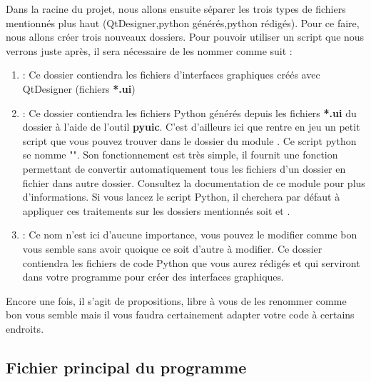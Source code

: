 Dans la racine du projet, nous allons ensuite séparer les trois types de fichiers mentionnés plus haut (QtDesigner,python générés,python rédigés). Pour ce faire, nous allons créer  trois nouveaux dossiers. Pour pouvoir utiliser un script que nous verrons juste après, il sera nécessaire de les nommer comme suit :
\begin{enumerate}

\item {} : Ce dossier contiendra les fichiers d'interfaces graphiques créés avec QtDesigner (fichiers \textbf{*.ui})\newline

\item {} : Ce dossier contiendra les fichiers Python générés depuis les fichiers \textbf{*.ui} du dossier  à l'aide de l'outil \textbf{pyuic}.\newline
C'est d'ailleurs ici que rentre en jeu un petit script que vous pouvez trouver dans le dossier du module . Ce script python se nomme "". Son fonctionnement est très simple, il fournit une fonction permettant de convertir automatiquement tous les fichiers  d'un dossier en fichier  dans autre dossier. Consultez la documentation de ce module pour plus d'informations.\newline
Si vous lancez le script Python, il cherchera par défaut à appliquer ces traitements sur les dossiers mentionnés soit  et .

\item {} : Ce nom n'est ici d'aucune importance, vous pouvez le modifier comme bon vous semble sans avoir quoique ce soit d'autre à modifier.\newline
Ce dossier contiendra les fichiers de code Python que vous aurez rédigés et qui serviront dans votre programme pour créer des interfaces graphiques.

\end{enumerate}

Encore une fois, il s'agit de propositions, libre à vous de les renommer comme bon vous semble mais il vous faudra certainement adapter votre code à certains endroits.

\subsection{Fichier principal du programme}

